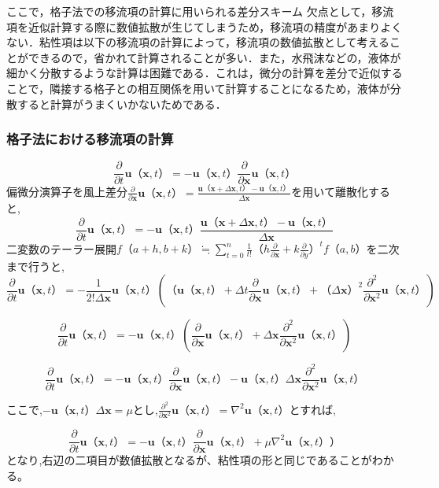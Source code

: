 \documentclass[a4j,12pt]{jreport}
\begin{document}
ここで，格子法での移流項の計算に用いられる差分スキーム
欠点として，移流項を近似計算する際に数値拡散が生じてしまうため，移流項の精度があまりよくない．粘性項は以下の移流項の計算によって，移流項の数値拡散として考えることができるので，省かれて計算されることが多い．また，水飛沫などの，液体が細かく分散するような計算は困難である．これは，微分の計算を差分で近似することで，隣接する格子との相互関係を用いて計算することになるため，液体が分散すると計算がうまくいかないためである．

\subsubsection{格子法における移流項の計算} \label{subsec:gridadvect}
$$\frac{\partial}{\partial t}\bm{u}（\bm{x},t） = -\bm{u}（\bm{x},t）\frac{\partial}{\partial \bm{x}}\bm{u}（\bm{x},t）$$
偏微分演算子を風上差分$\frac{\partial}{\partial \bm{x}}\bm{u}（\bm{x},t） = \frac{\bm{u}（\bm{x}+\varDelta \bm{x},t） - \bm{u}（\bm{x},t）}{\varDelta \bm{x}}$を用いて離散化すると,
$$\frac{\partial}{\partial t}\bm{u}（\bm{x},t） =  -\bm{u}（\bm{x},t）\frac{\bm{u}（\bm{x}+\varDelta \bm{x},t） - \bm{u}（\bm{x},t）}{\varDelta \bm{x}}$$
二変数のテーラー展開$f（a+h,b+k） \fallingdotseq \sum\limits_{t=0}^n \frac{1}{t!}（h\frac{\partial}{\partial \bm{x}} + k\frac{\partial}{\partial y}）^t f（a,b）$を二次まで行うと,
$$\frac{\partial}{\partial t}\bm{u}（\bm{x},t） = -\frac{1}{2!\varDelta \bm{x}}\bm{u}（\bm{x},t）\left( （\bm{u}（\bm{x},t）+\varDelta t\frac{\partial}{\partial \bm{x}}\bm{u}（\bm{x},t） + （\varDelta \bm{x}）^2\frac{\partial^2}{\partial \bm{x}^2}\bm{u}（\bm{x},t） \right)$$
            
$$\frac{\partial}{\partial t}\bm{u}（\bm{x},t） =  -\bm{u}（\bm{x},t）\left(\frac{\partial}{\partial \bm{x}}\bm{u}（\bm{x},t） + \varDelta \bm{x}\frac{\partial^2}{\partial \bm{x}^2}\bm{u}（\bm{x},t） \right)$$

$$ \frac{\partial}{\partial t}\bm{u}（\bm{x},t） =  -\bm{u}（\bm{x},t）\frac{\partial}{\partial \bm{x}}\bm{u}（\bm{x},t） -\bm{u}（\bm{x},t）\varDelta \bm{x}\frac{\partial^2}{\partial \bm{x}^2}\bm{u}（\bm{x},t）$$

ここで,$ -\bm{u}（\bm{x},t）\varDelta \bm{x} = \mu$とし,$\frac{\partial^2}{\partial \bm{x}^2}\bm{u}（\bm{x},t） = \nabla^2\bm{u}（\bm{x},t）$とすれば,

$$ \frac{\partial}{\partial t}\bm{u}（\bm{x},t） =  -\bm{u}（\bm{x},t）\frac{\partial}{\partial \bm{x}}\bm{u}（\bm{x},t） +\mu\nabla^2\bm{u}（\bm{x},t））$$
となり,右辺の二項目が数値拡散となるが、粘性項の形と同じであることがわかる。
\end{document}
